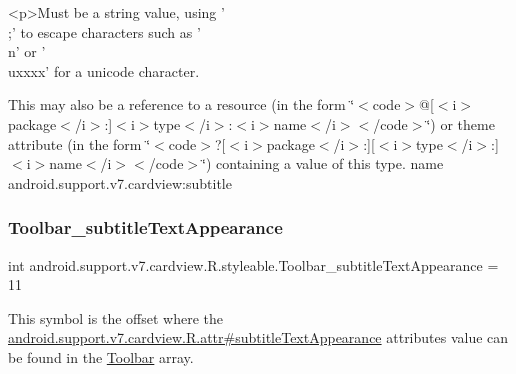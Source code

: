 \begin{DoxyVerb}      <p>Must be a string value, using '\\;' to escape characters such as '\\n' or '\\uxxxx' for a unicode character.
\end{DoxyVerb}
 

This may also be a reference to a resource (in the form \char`\"{}$<$code$>$@\mbox{[}$<$i$>$package$<$/i$>$\+:\mbox{]}$<$i$>$type$<$/i$>$\+:$<$i$>$name$<$/i$>$$<$/code$>$\char`\"{}) or theme attribute (in the form \char`\"{}$<$code$>$?\mbox{[}$<$i$>$package$<$/i$>$\+:\mbox{]}\mbox{[}$<$i$>$type$<$/i$>$\+:\mbox{]}$<$i$>$name$<$/i$>$$<$/code$>$\char`\"{}) containing a value of this type.  name android.\+support.\+v7.\+cardview\+:subtitle \mbox{\label{classandroid_1_1support_1_1v7_1_1cardview_1_1R_1_1styleable_aa11a7434ed1156d4cb5332750e4d47d7}} 
\subsubsection{\texorpdfstring{Toolbar\+\_\+subtitle\+Text\+Appearance}{Toolbar\_subtitleTextAppearance}}
{\footnotesize\ttfamily int android.\+support.\+v7.\+cardview.\+R.\+styleable.\+Toolbar\+\_\+subtitle\+Text\+Appearance = 11\hspace{0.3cm}{\ttfamily [static]}}

This symbol is the offset where the \hyperlink{classandroid_1_1support_1_1v7_1_1cardview_1_1R_1_1attr_ac11cc67ed57bc796e7e120d6c5b5e347}{android.\+support.\+v7.\+cardview.\+R.\+attr\#subtitle\+Text\+Appearance} attribute\textquotesingle{}s value can be found in the \hyperlink{classandroid_1_1support_1_1v7_1_1cardview_1_1R_1_1styleable_a26149aeb8fd339abe09ecc9d92b9304f}{Toolbar} array.

